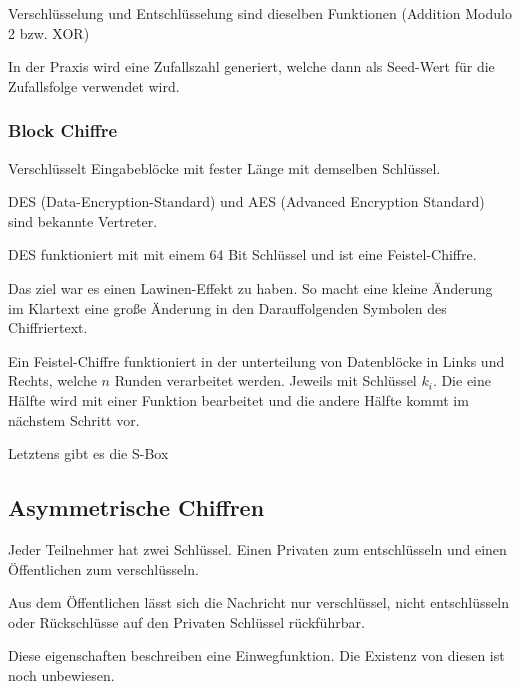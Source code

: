 \documentclass[a4paper]{article}
\begin{document}
Verschlüsselung und Entschlüsselung sind dieselben Funktionen (Addition Modulo 2 bzw. XOR)

In der Praxis wird eine Zufallszahl generiert, welche dann als Seed-Wert für die Zufallsfolge verwendet wird.

\subsubsection{Block Chiffre}

Verschlüsselt Eingabeblöcke mit fester Länge mit demselben Schlüssel.

DES (Data-Encryption-Standard) und AES (Advanced Encryption Standard) sind bekannte Vertreter.


DES funktioniert mit mit einem 64 Bit Schlüssel und ist eine Feistel-Chiffre.

Das ziel war es einen Lawinen-Effekt zu haben. So macht eine kleine Änderung im Klartext eine große Änderung in den Darauffolgenden Symbolen des Chiffriertext.

Ein Feistel-Chiffre funktioniert in der unterteilung von Datenblöcke in Links und Rechts, welche $n$ Runden verarbeitet werden. Jeweils mit Schlüssel $k_i$. Die eine Hälfte wird mit einer Funktion bearbeitet und die andere Hälfte kommt im nächstem Schritt vor.

Letztens gibt es die S-Box %





\subsection{Asymmetrische Chiffren}

Jeder Teilnehmer hat zwei Schlüssel. Einen Privaten zum entschlüsseln und einen Öffentlichen zum verschlüsseln.

Aus dem Öffentlichen lässt sich die Nachricht nur verschlüssel, nicht entschlüsseln oder Rückschlüsse auf den Privaten Schlüssel rückführbar.

Diese eigenschaften beschreiben eine Einwegfunktion. Die Existenz von diesen ist noch unbewiesen.
\end{document}
